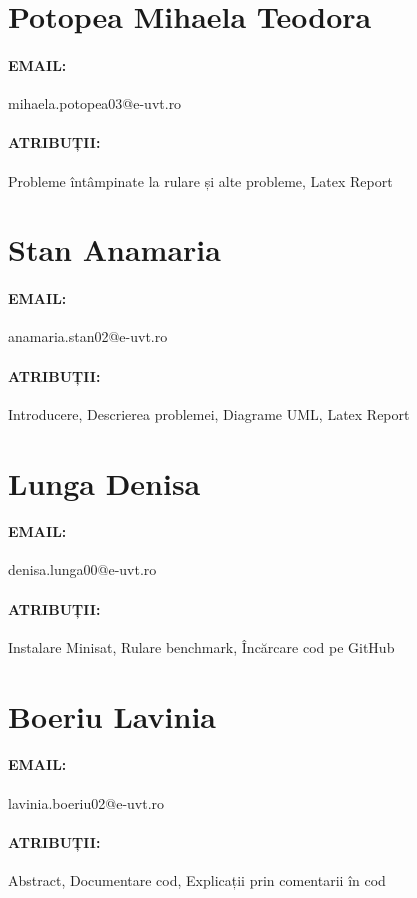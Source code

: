 \documentclass[12pt,a4paper]{report}
\begin{document}
\section{Potopea Mihaela Teodora}
\paragraph{EMAIL:} mihaela.potopea03@e-uvt.ro

\paragraph{ATRIBUȚII:} Probleme întâmpinate la rulare și alte probleme, Latex Report

\section{Stan Anamaria}
\paragraph{EMAIL:} anamaria.stan02@e-uvt.ro

\paragraph{ATRIBUȚII:} Introducere, Descrierea problemei, Diagrame UML, Latex Report

\section{Lunga Denisa}
\paragraph{EMAIL:} denisa.lunga00@e-uvt.ro

\paragraph{ATRIBUȚII:} Instalare Minisat, Rulare benchmark, Încărcare cod pe GitHub

\section{Boeriu Lavinia}

\paragraph{EMAIL:} lavinia.boeriu02@e-uvt.ro

\paragraph{ATRIBUȚII:} Abstract, Documentare cod, Explicații prin comentarii în cod

\newpage
 












\end{document}
